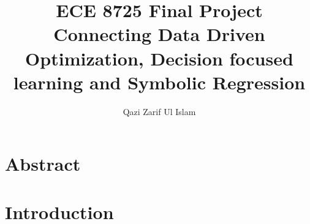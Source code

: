 \documentclass[12pt, letterpaper]{article}
\title{ECE 8725 Final Project\\
    \large Connecting Data Driven Optimization, Decision focused learning and Symbolic Regression}
\author{Qazi Zarif Ul Islam}
\begin{document}
\maketitle

\section{Abstract}

\section{Introduction}




\end{document}
